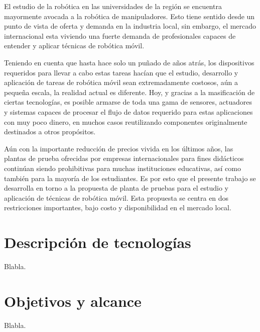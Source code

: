 El estudio de la robótica en las universidades de la región se encuentra mayormente avocada a la robótica de manipuladores. Esto tiene sentido desde un punto de vista de oferta y demanda en la industria local, sin embargo, el mercado internacional esta viviendo una fuerte demanda de profesionales capaces de entender y aplicar técnicas de robótica móvil.

Teniendo en cuenta que hasta hace solo un puñado de años atrás, los dispositivos requeridos para llevar a cabo estas tareas hacían que el estudio, desarrollo y aplicación de tareas de robótica móvil sean extremadamente costosos, aún a pequeña escala, la realidad actual es diferente. Hoy, y gracias a la masificación de ciertas tecnologías, es posible armarse de toda una gama de sensores, actuadores y sistemas capaces de procesar el flujo de datos requerido para estas aplicaciones con muy poco dinero, en muchos casos reutilizando componentes originalmente destinados a otros propósitos.

Aún con la importante reducción de precios vivida en los últimos años, las plantas de prueba ofrecidas por empresas internacionales para fines didácticos continúan siendo prohibitivas para muchas instituciones educativas, así como también para la mayoría de los estudiantes. Es por esto que el presente trabajo se desarrolla en torno a la propuesta de planta de pruebas para el estudio y aplicación de técnicas de robótica móvil. Esta propuesta se centra en dos restricciones importantes, bajo costo y disponibilidad en el mercado local.


\section{Descripción de tecnologías}

Blabla.


\section{Objetivos y alcance}

Blabla.
